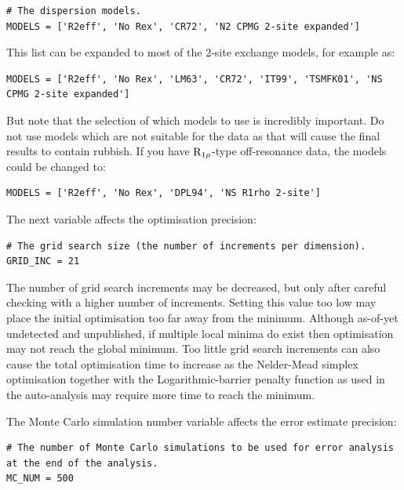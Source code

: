 \begin{lstlisting}[firstnumber=14]
# The dispersion models.
MODELS = ['R2eff', 'No Rex', 'CR72', 'N2 CPMG 2-site expanded']
\end{lstlisting}

This list can be expanded to most of the 2-site exchange models, for example as:

\begin{lstlisting}[numbers=none]
MODELS = ['R2eff', 'No Rex', 'LM63', 'CR72', 'IT99', 'TSMFK01', 'NS CPMG 2-site expanded']
\end{lstlisting}

But note that the selection of which models to use is incredibly important.
Do not use models which are not suitable for the data as that will cause the final results to contain rubbish.
If you have $\mathrm{R}_{1\rho}$-type off-resonance data, the models could be changed to:

\begin{lstlisting}[numbers=none]
MODELS = ['R2eff', 'No Rex', 'DPL94', 'NS R1rho 2-site']
\end{lstlisting}

The next variable affects the optimisation precision:

\begin{lstlisting}[firstnumber=17]
# The grid search size (the number of increments per dimension).
GRID_INC = 21
\end{lstlisting}

The number of grid search increments may be decreased, but only after careful checking with a higher number of increments.
Setting this value too low may place the initial optimisation too far away from the minimum.
Although as-of-yet undetected and unpublished, if multiple local minima do exist then optimisation may not reach the global minimum.
Too little grid search increments can also cause the total optimisation time to increase as the Nelder-Mead simplex optimisation together with the Logarithmic-barrier penalty function as used in the auto-analysis may require more time to reach the minimum.

The Monte Carlo simulation number  variable affects the error estimate precision:

\begin{lstlisting}[firstnumber=20]
# The number of Monte Carlo simulations to be used for error analysis at the end of the analysis.
MC_NUM = 500
\end{lstlisting}

